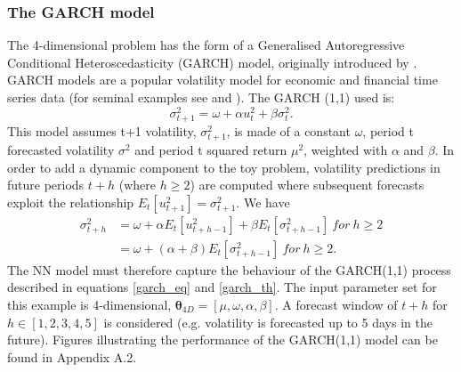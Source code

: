 \documentclass{article}
\begin{document}
\subsubsection{The GARCH model}
The 4-dimensional problem has the form of a Generalised Autoregressive Conditional Heteroscedasticity (GARCH) model, originally introduced by \cite{BOLLERSLEV1986307}. GARCH models are a popular volatility model for economic and financial time series data  (for seminal examples see \cite{FRENCH19873} and \cite{franses1996forecasting}). The GARCH (1,1) used is:
\begin{equation}
	\label{garch_eq}
	\sigma_{t+1}^2 = \omega + \alpha u_{t}^2 + \beta \sigma_{t}^2.
\end{equation}
This model assumes t+1 volatility, $\sigma_{t+1}^2$, is made of a constant $\omega$, period t forecasted volatility $\sigma^2$ and period t squared return $\mu^2$, weighted with $\alpha$ and $\beta$. In order to add a dynamic component to the toy problem, volatility predictions in future periods $t + h$ (where $h \geq 2$) are computed where subsequent forecasts exploit the relationship $E_t [u_{t+1}^2]= \sigma_{t+1}^2$. We have
\begin{equation}
	\label{garch_th}
	\begin{split}
	\sigma_{t+h}^2 &= \omega + \alpha E_t [u_{t+h-1}^2] + \beta E_t [\sigma_{t+h-1}^2] \ for \ h \geq 2
	\\
	&= \omega + (\alpha + \beta) E_t [\sigma_{t+h-1}^2] \ for \ h \geq 2.
	\end{split}
\end{equation}
The NN model must therefore capture the behaviour of the GARCH(1,1) process described in equations \ref{garch_eq} and \ref{garch_th}. The input parameter set for this example is 4-dimensional, $\boldsymbol{\theta}_{4D} = [\mu, \omega, \alpha, \beta]$. A forecast window of $t + h$ for $h \in [1, 2, 3, 4, 5]$ is considered (e.g. volatility is forecasted up to 5 days in the future). Figures illustrating the performance of the GARCH(1,1) model can be found in Appendix A.2. 

\end{document}
